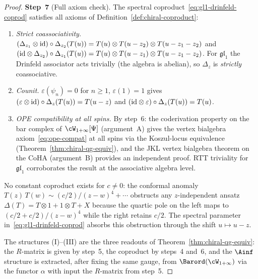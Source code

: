 \begin{proof}
\medskip
\noindent
\textbf{Step~7}
(Full axiom check).
The spectral coproduct~\eqref{eq:gl1-drinfeld-coprod}
satisfies all axioms of
Definition~\ref{def:chiral-coproduct}:
\begin{enumerate}[label=\textup{(\alph*)}]
\item \emph{Strict coassociativity.}
 $(\Delta_{z_1} \otimes \mathrm{id}) \circ \Delta_{z_2}(T(u))
 = T(u) \otimes T(u - z_2) \otimes T(u - z_1 - z_2)$
 and
 $(\mathrm{id} \otimes \Delta_{z_2}) \circ \Delta_{z_1}(T(u))
 = T(u) \otimes T(u - z_1) \otimes T(u - z_1 - z_2)$.
 For $\mathfrak{gl}_1$ the Drinfeld associator
 acts trivially (the algebra is abelian), so
 $\Delta_z$ is \emph{strictly} coassociative.
\item \emph{Counit.}
 $\varepsilon(\psi_n) = 0$ for $n \geq 1$,
 $\varepsilon(1) = 1$ gives
 $(\varepsilon \otimes \mathrm{id}) \circ \Delta_z(T(u))
 = T(u - z)$ and
 $(\mathrm{id} \otimes \varepsilon) \circ \Delta_z(T(u))
 = T(u)$.
\item \emph{OPE compatibility at all spins.}
 By step~6: the coderivation property on the bar complex
 of $\cW_{1+\infty}[\Psi]$ (argument~A) gives the vertex
 bialgebra axiom~\eqref{eq:ope-compat} at all spins via
 the Koszul-locus equivalence
 (Theorem~\ref{thm:chiral-qg-equiv}), and the JKL vertex
 bialgebra theorem on the CoHA (argument~B) provides an
 independent proof. RTT triviality for $\mathfrak{gl}_1$
 corroborates the result at the associative algebra level.
\end{enumerate}
No constant coproduct exists for $c \neq 0$: the
conformal anomaly $T(z)\,T(w) \sim (c/2)/(z-w)^4 +
\cdots$ obstructs any $z$-independent ansatz
$\Delta(T) = T \otimes 1 + 1 \otimes T + X$
because the quartic pole on the left maps to
$(c/2 + c/2)/(z-w)^4$ while the right retains $c/2$.
The spectral parameter in~\eqref{eq:gl1-drinfeld-coprod}
absorbs this obstruction through the shift
$u \mapsto u - z$.

The structures (I)--(III) are the three readouts of
Theorem~\ref{thm:chiral-qg-equiv}: the $R$-matrix is
given by step~5, the coproduct by steps~4 and~6, and the
$\Ainf$ structure is extracted, after fixing the same gauge, from
$\Barord(\cW_{1+\infty})$ via the functor $\alpha$
with input the $R$-matrix from step~5.
\end{proof}

